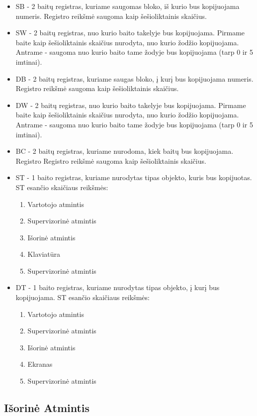 \documentclass{VUMIFInfKursinis}
\begin{document}
\begin{itemize}
	\item SB - 2 baitų registras, kuriame saugomas bloko, iš kurio bus kopijuojama numeris. Registro reikšmė saugoma kaip šešioliktainis skaičius.
	\item SW - 2 baitų registras, nuo kurio baito takelyje bus kopijuojama. Pirmame baite kaip šešioliktainis skaičius nurodyta, nuo kurio žodžio kopijuojama. Antrame - saugoma nuo kurio baito tame žodyje bus kopijuojama (tarp 0 ir 5 imtinai).
	\item DB - 2 baitų registras, kuriame saugas bloko, į kurį bus kopijuojama numeris. Registro reikšmė saugoma kaip šešioliktainis skaičius.
	\item DW - 2 baitų registras, nuo kurio baito takelyje bus kopijuojama. Pirmame baite kaip šešioliktainis skaičius nurodyta, nuo kurio žodžio kopijuojama. Antrame - saugoma nuo kurio baito tame žodyje bus kopijuojama (tarp 0 ir 5 imtinai).
	\item BC - 2 baitų registras, kuriame nurodoma, kiek baitų bus kopijuojama. Registro Registro reikšmė saugoma kaip šešioliktainis skaičius.
	\item ST - 1 baito registras, kuriame nurodytas tipas objekto, kuris bus kopijuotas. ST esančio skaičiaus reikšmės:
	\begin{enumerate}
		\item Vartotojo atmintis
		\item Supervizorinė atmintis
		\item Išorinė atmintis
		\item Klaviatūra
		\item Supervizorinė atmintis
	\end{enumerate}
	\item DT - 1 baito registras, kuriame nurodytas tipas objekto, į kurį bus kopijuojama. ST esančio skaičiaus reikšmės:
	\begin{enumerate}
		\item Vartotojo atmintis
		\item Supervizorinė atmintis
		\item Išorinė atmintis
		\item Ekranas
		\item Supervizorinė atmintis
	\end{enumerate}
\end{itemize}

\subsection{Išorinė Atmintis}
\end{document}
